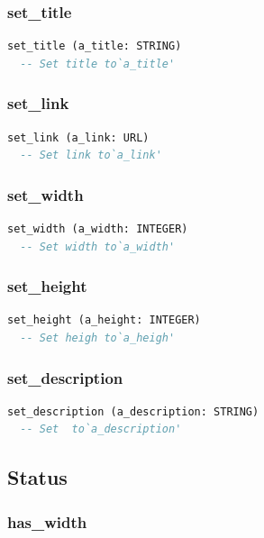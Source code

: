 \subsubsection{set\_title}

\begin{lstlisting}[language=Eiffel]
set_title (a_title: STRING)
  -- Set title to`a_title'
\end{lstlisting}

\subsubsection{set\_link}

\begin{lstlisting}[language=Eiffel]
set_link (a_link: URL)
  -- Set link to`a_link'
\end{lstlisting}

\subsubsection{set\_width}

\begin{lstlisting}[language=Eiffel]
set_width (a_width: INTEGER)
  -- Set width to`a_width'
\end{lstlisting}

\subsubsection{set\_height}

\begin{lstlisting}[language=Eiffel]
set_height (a_height: INTEGER)
  -- Set heigh to`a_heigh'
\end{lstlisting}

\subsubsection{set\_description}

\begin{lstlisting}[language=Eiffel]
set_description (a_description: STRING)
  -- Set  to`a_description'
\end{lstlisting}

\subsection{Status}
\label{sec:channel-image-status}

\subsubsection{has\_width}


